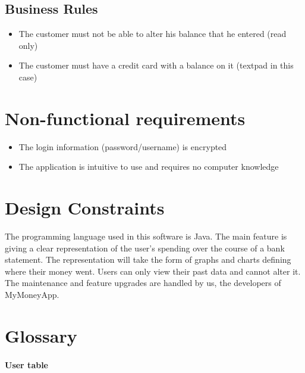 \documentclass[letterpaper]{article}
\begin{document}
	\subsection{Business Rules}
	
		\begin{itemize}
			
			\item The customer must not be able to alter his balance that he entered (read only)
			
			\item The customer must have a credit card with a balance on it (textpad in this case)
			
		\end{itemize}

\newpage	

\section{Non-functional requirements}

	\begin{itemize}
		
		\item The login information (password/username) is encrypted 
		
		\item The application is intuitive to use and requires no computer knowledge
		
	\end{itemize}

\section{Design Constraints}

	The programming language used in this software is Java. The main feature is giving a clear representation of the user’s spending over the course of a bank statement. The representation will take the form of graphs and charts defining where their money went. Users can only view their past data and cannot alter it. The maintenance and feature upgrades are handled by us, the developers of MyMoneyApp.

\newpage

\section{Glossary}

	\paragraph{User table}
	
\end{document}
